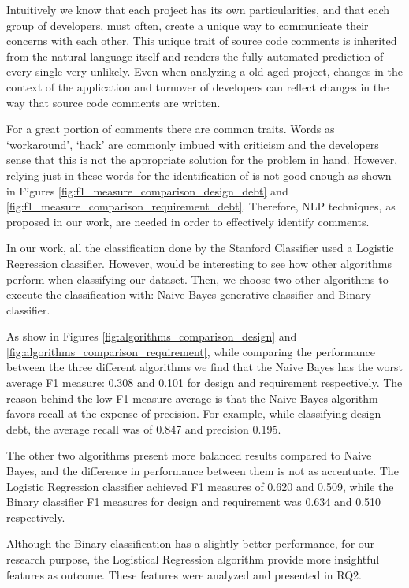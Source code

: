 Intuitively we know that each project has its own particularities, and that each group of developers, must often, create a unique way to communicate their concerns with each other. This unique trait of source code comments is inherited from the natural language itself and renders the fully automated prediction of every single \SATD very unlikely. Even when analyzing a old aged project, changes in the context of the application and turnover of developers can reflect changes in the way that source code comments are written. 

For a great portion of \SATD comments there are common traits. Words as `workaround', `hack' are commonly imbued with criticism and the developers sense that this is not the appropriate solution for the problem in hand. However, relying just in these words for the identification of \SATD is not good enough as shown in Figures \ref{fig:f1_measure_comparison_design_debt} and \ref{fig:f1_measure_comparison_requirement_debt}. Therefore, NLP techniques, as proposed in our work, are needed in order to effectively identify \SATD comments.

In our work, all the classification done by the Stanford Classifier used a Logistic Regression classifier. However, would be interesting to see how other  algorithms perform when classifying our dataset. Then, we choose two other algorithms to execute the classification with: Naive Bayes generative classifier and Binary classifier.

As show in Figures \ref{fig:algorithms_comparison_design} and \ref{fig:algorithms_comparison_requirement}, while comparing the performance between the three different algorithms we find that the Naive Bayes has the worst average F1 measure: 0.308 and 0.101 for design and requirement \SATD respectively. The reason behind the low F1 measure average is that the Naive Bayes algorithm favors recall at the expense of precision. For example, while classifying design debt, the average recall was of 0.847 and precision 0.195.

The other two algorithms present more balanced results compared to Naive Bayes, and the difference in performance between them is not as accentuate. The Logistic Regression classifier achieved F1 measures of 0.620 and 0.509, while the Binary classifier F1 measures for design and requirement \SATD was 0.634 and 0.510 respectively. 

Although the Binary classification has a slightly better performance, for our research purpose, the Logistical Regression algorithm provide more insightful features as outcome. These features were analyzed and presented in RQ2. 